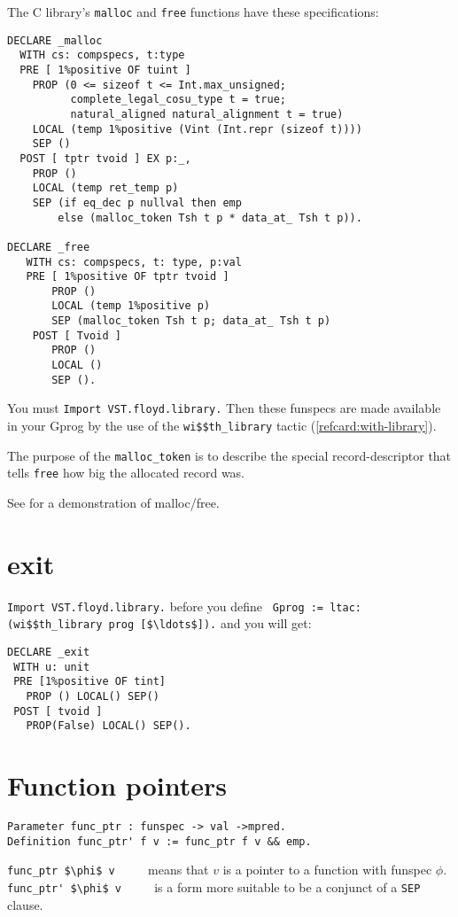 \documentclass[12pt,fleqn,openany,oneside,showtrims]{memoir}
\begin{document}
The C library's \lstinline|malloc| and \lstinline|free| functions
have these specifications:
\begin{lstlisting}
DECLARE _malloc
  WITH cs: compspecs, t:type
  PRE [ 1%positive OF tuint ]
    PROP (0 <= sizeof t <= Int.max_unsigned;
          complete_legal_cosu_type t = true;
          natural_aligned natural_alignment t = true)
    LOCAL (temp 1%positive (Vint (Int.repr (sizeof t))))
    SEP ()
  POST [ tptr tvoid ] EX p:_,
    PROP ()
    LOCAL (temp ret_temp p)
    SEP (if eq_dec p nullval then emp
        else (malloc_token Tsh t p * data_at_ Tsh t p)).

DECLARE _free
   WITH cs: compspecs, t: type, p:val
   PRE [ 1%positive OF tptr tvoid ]
       PROP ()
       LOCAL (temp 1%positive p)
       SEP (malloc_token Tsh t p; data_at_ Tsh t p)
    POST [ Tvoid ]
       PROP ()
       LOCAL ()
       SEP ().
\end{lstlisting}
You must \lstinline{Import VST.floyd.library.}
Then these funspecs are made available in your Gprog by the use of the
\lstinline{wi$$th_library} tactic (\autoref{refcard:with-library}).

The purpose of the \lstinline{malloc_token} is to describe the special
record-descriptor that tells \lstinline{free} how big the allocated
record was.

See  for a demonstration of malloc/free.

\chapter{exit}
\lstinline{Import VST.floyd.library.}
before you define\newline
\lstinline{ Gprog := ltac:(wi$$th_library prog [$\ldots$]).}
\newline and you will get:

\begin{lstlisting}
DECLARE _exit
 WITH u: unit
 PRE [1%positive OF tint]
   PROP () LOCAL() SEP()
 POST [ tvoid ]
   PROP(False) LOCAL() SEP().
\end{lstlisting}

\chapter{Function pointers}
\label{refcard:funcptr}
\begin{lstlisting}
Parameter func_ptr : funspec -> val ->mpred.
Definition func_ptr' f v := func_ptr f v && emp.
\end{lstlisting}
\lstinline{func_ptr $\phi$ v} $\qquad$ means that $v$
is a pointer to a function with funspec $\phi$.\newline
\lstinline{func_ptr' $\phi$ v} $\qquad$ is a form more suitable to
be a conjunct of a \lstinline{SEP} clause.
\end{document}
